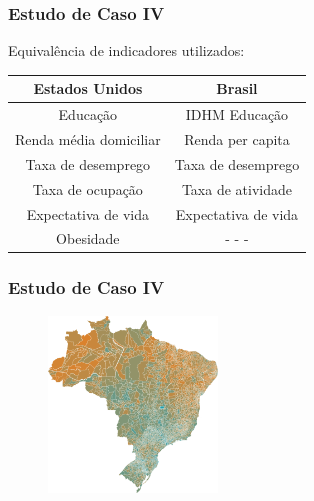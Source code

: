 \documentclass[aspectratio=169]{beamer}
\begin{document}
\begin{frame}
\frametitle{Estudo de Caso IV}
\justifying

Equivalência de indicadores utilizados: 

\begin{center}
  \begin{tabular}{ c | c }
    \hline
    \textbf{Estados Unidos} & \textbf{Brasil} \\ \hline
    Educação & IDHM Educação \\ \hline
    Renda média domiciliar & Renda per capita \\ \hline
    Taxa de desemprego & Taxa de desemprego \\ \hline
    Taxa de ocupação &  Taxa de atividade \\ \hline
    Expectativa de vida & Expectativa de vida\\ \hline
    Obesidade & - - - 	\\
    \hline
  \end{tabular}
\end{center}


\end{frame}

\begin{frame}
\frametitle{Estudo de Caso IV}
\justifying

\begin{figure}
\centering
\includegraphics[width=0.4\textwidth]{images/qualidade-de-vida.png}
\end{figure}

\end{frame}
\end{document}
